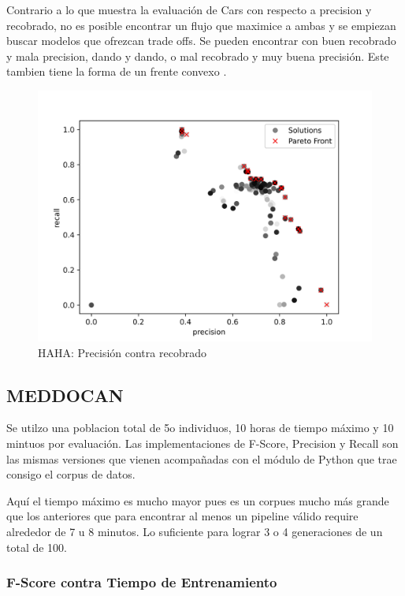 Contrario a lo que muestra la evaluaci\'on de Cars con respecto a precision y recobrado, no es posible encontrar un flujo que maximice a ambas y se empiezan buscar modelos que ofrezcan trade offs. Se pueden encontrar con buen recobrado y mala precision, dando y dando, o mal recobrado y muy buena precisi\'on. Este tambien tiene la forma de un frente convexo .

\begin{figure}[ht]
    \centering
    \includegraphics[scale=0.8]{Pictures/haha_precision_vs_recall.jpg}
    \caption{HAHA: Precisi\'on contra recobrado}
    \label{impl:fig:HAHA:precision_vs_recall}
\end{figure}

\subsection{MEDDOCAN}

Se utilzo una poblacion total de 5o individuos, 10 horas de tiempo m\'aximo y 10 mintuos por  evaluaci\'on. Las implementaciones de F-Score, Precision y Recall son las mismas versiones que vienen acompa\~nadas con el m\'odulo de Python que trae consigo el corpus de datos.

Aqu\'i el tiempo m\'aximo es mucho mayor pues es un corpues mucho m\'as grande que los anteriores que para encontrar al menos un pipeline v\'alido require alrededor de 7 u 8 minutos. Lo suficiente para lograr 3 o 4 generaciones de un total de 100.


\subsubsection{F-Score contra Tiempo de Entrenamiento}


